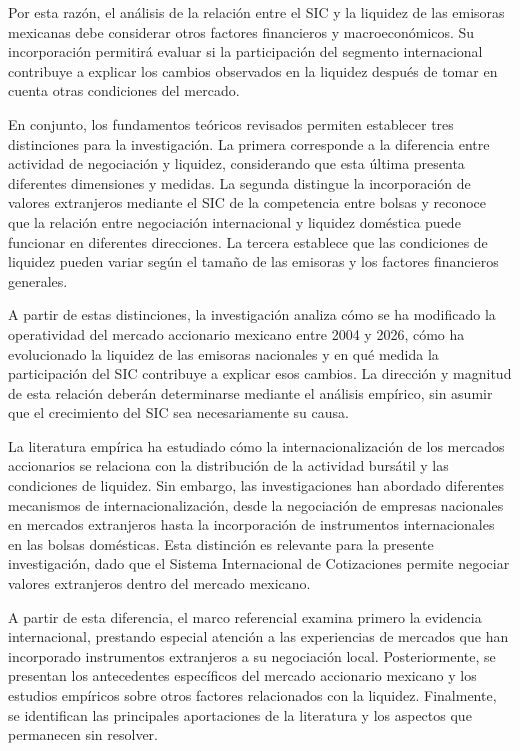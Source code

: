 Por esta razón, el análisis de la relación entre el SIC y la liquidez de las emisoras mexicanas debe considerar otros factores financieros y macroeconómicos. Su incorporación permitirá evaluar si la participación del segmento internacional contribuye a explicar los cambios observados en la liquidez después de tomar en cuenta otras condiciones del mercado.

En conjunto, los fundamentos teóricos revisados permiten establecer tres distinciones para la investigación. La primera corresponde a la diferencia entre actividad de negociación y liquidez, considerando que esta última presenta diferentes dimensiones y medidas. La segunda distingue la incorporación de valores extranjeros mediante el SIC de la competencia entre bolsas y reconoce que la relación entre negociación internacional y liquidez doméstica puede funcionar en diferentes direcciones. La tercera establece que las condiciones de liquidez pueden variar según el tamaño de las emisoras y los factores financieros generales.

A partir de estas distinciones, la investigación analiza cómo se ha modificado la operatividad del mercado accionario mexicano entre 2004 y 2026, cómo ha evolucionado la liquidez de las emisoras nacionales y en qué medida la participación del SIC contribuye a explicar esos cambios. La dirección y magnitud de esta relación deberán determinarse mediante el análisis empírico, sin asumir que el crecimiento del SIC sea necesariamente su causa.


La literatura empírica ha estudiado cómo la internacionalización de los mercados accionarios se relaciona con la distribución de la actividad bursátil y las condiciones de liquidez. Sin embargo, las investigaciones han abordado diferentes mecanismos de internacionalización, desde la negociación de empresas nacionales en mercados extranjeros hasta la incorporación de instrumentos internacionales en las bolsas domésticas. Esta distinción es relevante para la presente investigación, dado que el Sistema Internacional de Cotizaciones permite negociar valores extranjeros dentro del mercado mexicano.

A partir de esta diferencia, el marco referencial examina primero la evidencia internacional, prestando especial atención a las experiencias de mercados que han incorporado instrumentos extranjeros a su negociación local. Posteriormente, se presentan los antecedentes específicos del mercado accionario mexicano y los estudios empíricos sobre otros factores relacionados con la liquidez. Finalmente, se identifican las principales aportaciones de la literatura y los aspectos que permanecen sin resolver.

